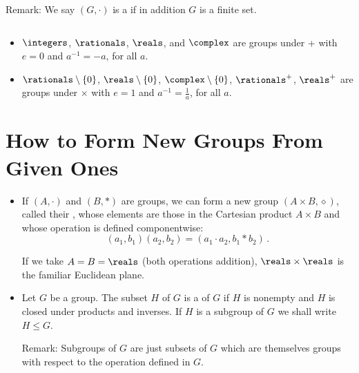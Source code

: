 Remark: We say $(G, \cdot)$ is a  if in addition $G$ is a 
finite set.

\begin{example}
	$ $
	\begin{itemize}
		\item $\integers$, $\rationals$, $\reals$, and $\complex$ 
		are groups under + with $e = 0$ and $a^{-1} = -a$, for all 
		$a$.
		
		\item $\rationals \setminus \{ 0 \}$, $\reals \setminus \{ 
		0 \}$, $\complex \setminus \{ 0 \}$, $\rationals^+$, 
		$\reals^+$ are groups under $\times$ with $e = 1$ and 
		$a^{-1} = \frac{1}{a}$, for all $a$.
	\end{itemize}
\end{example}


\newpage

\section{How to Form New Groups From Given Ones}

\begin{itemize}
	\item If $(A,\cdot)$ and $(B,*)$ are groups, we can form a new
	group $(A \times B, \diamond)$, called their , whose elements are 
	those in the Cartesian product $A \times B$ and whose operation 
	is defined componentwise:
	\[
		(a_1,b_1)(a_2,b_2) = (a_1 \cdot a_2, b_1 * b_2)\,.
	\]

	\begin{example}
		If we take $A = B = \reals$ (both operations addition), 
		$\reals \times \reals$ is the familiar Euclidean plane.
	\end{example}

	\item Let $G$ be a group. The subset $H$ of $G$ is a 
	 of $G$ if $H$ is 
	nonempty and $H$ is closed under products and inverses. If $H$ 
	is a subgroup of $G$ we shall write $H \leq G$.
	
	Remark: Subgroups of $G$ are just subsets of $G$ which are 
	themselves groups with respect to the operation defined in $G$.

\end{itemize}

